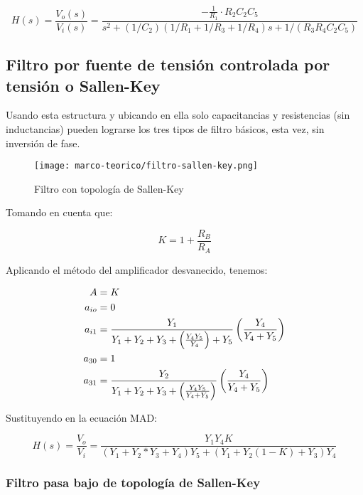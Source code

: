 \begin{equation}[ht]
    H(s) = \frac{V_o(s)}{V_i(s)} = \frac{-\frac{1}{R_1}\cdot R_2C_2 C_5}{s^2 + (1/C_2)(1/R_1 + 1/R_3 + 1/R_4)s + 1/(R_3 R_4 C_2 C_5)}
    \label{eq:func-transferencia-pasa-bajos-multirealimentacion}
\end{equation}

\subsection{Filtro por fuente de tensión controlada por tensión o Sallen-Key}

Usando esta estructura y ubicando en ella solo capacitancias y resistencias (sin inductancias) pueden lograrse los tres tipos de filtro básicos, esta vez, sin inversión de fase.

\begin{figure}[ht]
    \centering
    \texttt{[image: marco-teorico/filtro-sallen-key.png]}
    \caption{Filtro con topología de Sallen-Key}
    \label{fig:filtro-activo-sallen-key}
\end{figure}

Tomando en cuenta que:

\begin{equation}
    K = 1 + \frac{R_B}{R_A}
\end{equation}

Aplicando el método del amplificador desvanecido, tenemos:

\begin{align}
    A &= K \\
    a_{io} &= 0 \\
    a_{i1} &= \frac{Y_1}{Y_1 + Y_2 + Y_3 + \left( \frac{Y_4 Y_5}{Y_4} \right) + Y_5} \left( \frac{Y_4}{Y_4 + Y_5} \right) \\
    a_{30} &= 1 \\
    a_{31} &= \frac{Y_2}{Y_1 + Y_2 + Y_3 + \left( \frac{Y_4 Y_5}{Y_4 + Y_5} \right)} \left( \frac{Y_4}{Y_4 + Y_5} \right) \\
\end{align}

Sustituyendo en la ecuación MAD:

\begin{equation}
    H(s) = \frac{V_o}{V_i} = \frac{Y_1 Y_4 K}{(Y_1 + Y_2 * Y_3 + Y_4)Y_5 + (Y_1 +Y_2(1-K)+Y_3)Y_4}
\end{equation}

\subsubsection{Filtro pasa bajo de topología de Sallen-Key}

